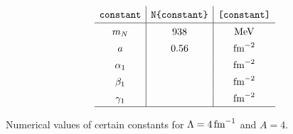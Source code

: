 \documentclass[aps,nofootinbib,prl,showpacs,twocolumn,groupedaddress,superscriptaddress]
{revtex4}
\newcommand{\la}{\label}
\newcommand{\be}{\begin{equation}}
\newcommand{\ee}{\end{equation}}
\newcommand{\lam}[1]{\mbox{\ensuremath{\Lambda=#1\,\text{fm}^{-1}}}}
\begin{document}
\begin{table}
\be\la{tab.constants}
\setlength{\tabcolsep}{4pt}
\renewcommand{\arraystretch}{1.4}
\begin{array}{c|c|c}
\texttt{constant}&\texttt{N\{constant\}}&\texttt{[constant]}\\
\hline
m_N       & 938    & \text{MeV}       \\
a         & 0.56   & \text{fm}^{-2}   \\
\alpha_1  &        & \text{fm}^{-2}   \\
\beta_1  &        & \text{fm}^{-2}   \\
\gamma_1  &        & \text{fm}^{-2}   \\
\hline
\end{array}
\ee
\caption{Numerical values of certain constants for $\lam{4}$ and $A=4$.}
\end{table}

\newpage
\end{document}
